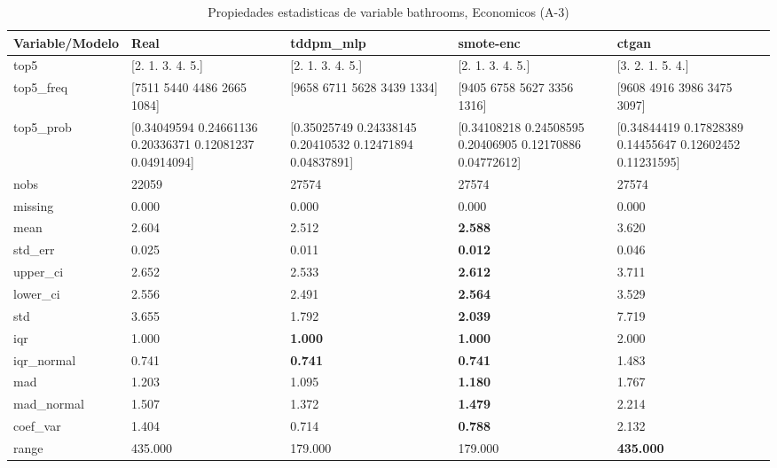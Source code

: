 \begin{table}[H]
\centering
\fontsize{8}{14}\selectfont
\caption{Propiedades  estadisticas de variable bathrooms, Economicos (A-3)}
\label{table-stats-economicos-a-3-bathrooms}
\begin{tabular}{|l|m{10em}|m{10em}|m{10em}|m{10em}|}
\hline
 \rowcolor[gray]{0.8}
Variable/Modelo & Real & tddpm\_mlp & smote-enc & ctgan \\
\hline top5 & [2. 1. 3. 4. 5.] & [2. 1. 3. 4. 5.] & [2. 1. 3. 4. 5.] & [3. 2. 1. 5. 4.] \\
\hline top5\_freq & [7511 5440 4486 2665 1084] & [9658 6711 5628 3439 1334] & [9405 6758 5627 3356 1316] & [9608 4916 3986 3475 3097] \\
\hline top5\_prob & [0.34049594 0.24661136 0.20336371 0.12081237 0.04914094] & [0.35025749 0.24338145 0.20410532 0.12471894 0.04837891] & [0.34108218 0.24508595 0.20406905 0.12170886 0.04772612] & [0.34844419 0.17828389 0.14455647 0.12602452 0.11231595] \\
\hline nobs & 22059 & 27574 & 27574 & 27574 \\
\hline missing & 0.000 & 0.000 & 0.000 & 0.000 \\
\hline mean & 2.604 & 2.512 & \bfseries 2.588 & \cellcolor[rgb]{0.9, 0.54, 0.52} 3.620 \\
\hline std\_err & 0.025 & 0.011 & \bfseries 0.012 & \cellcolor[rgb]{0.9, 0.54, 0.52} 0.046 \\
\hline upper\_ci & 2.652 & 2.533 & \bfseries 2.612 & \cellcolor[rgb]{0.9, 0.54, 0.52} 3.711 \\
\hline lower\_ci & 2.556 & 2.491 & \bfseries 2.564 & \cellcolor[rgb]{0.9, 0.54, 0.52} 3.529 \\
\hline std & 3.655 & 1.792 & \bfseries 2.039 & \cellcolor[rgb]{0.9, 0.54, 0.52} 7.719 \\
\hline iqr & 1.000 & \bfseries 1.000 & \bfseries 1.000 & \cellcolor[rgb]{0.9, 0.54, 0.52} 2.000 \\
\hline iqr\_normal & 0.741 & \bfseries 0.741 & \bfseries 0.741 & \cellcolor[rgb]{0.9, 0.54, 0.52} 1.483 \\
\hline mad & 1.203 & 1.095 & \bfseries 1.180 & \cellcolor[rgb]{0.9, 0.54, 0.52} 1.767 \\
\hline mad\_normal & 1.507 & 1.372 & \bfseries 1.479 & \cellcolor[rgb]{0.9, 0.54, 0.52} 2.214 \\
\hline coef\_var & 1.404 & 0.714 & \bfseries 0.788 & \cellcolor[rgb]{0.9, 0.54, 0.52} 2.132 \\
\hline range & 435.000 & \cellcolor[rgb]{0.9, 0.54, 0.52} 179.000 & \cellcolor[rgb]{0.9, 0.54, 0.52} 179.000 & \bfseries 435.000 \\

\end{tabular}
\end{table}
